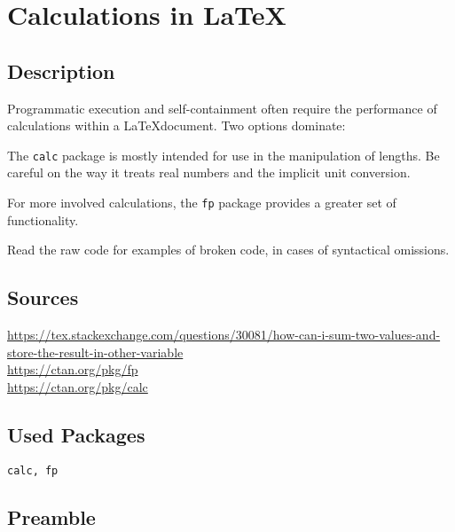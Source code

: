 \documentclass{article}
\newlength{\mylength}
\newlength{\myotherlength}
\newlength{\templength}
\newcommand\FPuse[1]{\FPeval{\result}{#1}{\result}} %
\begin{document}
\section*{Calculations in LaTeX}

\subsection*{Description}
Programmatic execution and self-containment often require the performance of calculations within a \LaTeX document.
Two options dominate:

The \verb|calc| package is mostly intended for use in the manipulation of lengths. Be careful on the way it treats real numbers and the implicit unit conversion.

For more involved calculations, the \verb|fp| package provides a greater set of functionality.

Read the raw code for examples of broken code, in cases of syntactical omissions.

\subsection*{Sources}
\url{https://tex.stackexchange.com/questions/30081/how-can-i-sum-two-values-and-store-the-result-in-other-variable}\\
\url{https://ctan.org/pkg/fp}\\
\url{https://ctan.org/pkg/calc}

\subsection*{Used Packages}
\verb|calc, fp|

\subsection*{Preamble}
\begin{latex}
\usepackage{calc}
\usepackage{fp}
\usepackage{tikz}

\newlength{\mylength}
\newlength{\myotherlength}
\newlength{\templength}
\newcommand\FPuse[1]{\FPeval{\result}{#1}{\result}} %
\end{latex}
\end{document}
